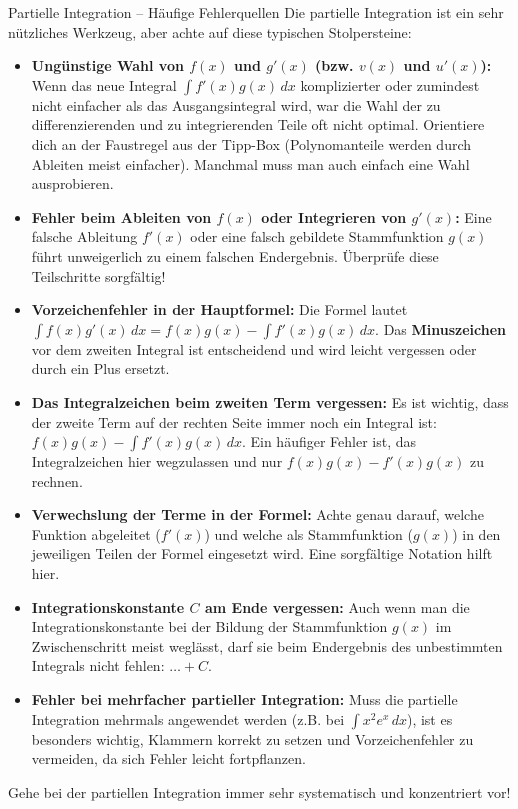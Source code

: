 \begin{fehlerboxumgebung}{Partielle Integration – Häufige Fehlerquellen}
Die partielle Integration ist ein sehr nützliches Werkzeug, aber achte auf diese typischen Stolpersteine:
\begin{itemize}
    \item \textbf{Ungünstige Wahl von $f(x)$ und $g'(x)$ (bzw. $v(x)$ und $u'(x)$):}
    Wenn das neue Integral $\int f'(x)g(x) \,dx$ komplizierter oder zumindest nicht einfacher als das Ausgangsintegral wird, war die Wahl der zu differenzierenden und zu integrierenden Teile oft nicht optimal. Orientiere dich an der Faustregel aus der Tipp-Box (Polynomanteile werden durch Ableiten meist einfacher). Manchmal muss man auch einfach eine Wahl ausprobieren.

    \item \textbf{Fehler beim Ableiten von $f(x)$ oder Integrieren von $g'(x)$:}
    Eine falsche Ableitung $f'(x)$ oder eine falsch gebildete Stammfunktion $g(x)$ führt unweigerlich zu einem falschen Endergebnis. Überprüfe diese Teilschritte sorgfältig!

    \item \textbf{Vorzeichenfehler in der Hauptformel:}
    Die Formel lautet $\int f(x) g'(x) \,dx = f(x)g(x) - \int f'(x)g(x) \,dx$. Das \textbf{Minuszeichen} vor dem zweiten Integral ist entscheidend und wird leicht vergessen oder durch ein Plus ersetzt.

    \item \textbf{Das Integralzeichen beim zweiten Term vergessen:}
    Es ist wichtig, dass der zweite Term auf der rechten Seite immer noch ein Integral ist: $f(x)g(x) - \mathbf{\int} f'(x)g(x) \,dx$. Ein häufiger Fehler ist, das Integralzeichen hier wegzulassen und nur $f(x)g(x) - f'(x)g(x)$ zu rechnen.

    \item \textbf{Verwechslung der Terme in der Formel:}
    Achte genau darauf, welche Funktion abgeleitet ($f'(x)$) und welche als Stammfunktion ($g(x)$) in den jeweiligen Teilen der Formel eingesetzt wird. Eine sorgfältige Notation hilft hier.

    \item \textbf{Integrationskonstante $C$ am Ende vergessen:}
    Auch wenn man die Integrationskonstante bei der Bildung der Stammfunktion $g(x)$ im Zwischenschritt meist weglässt, darf sie beim Endergebnis des unbestimmten Integrals nicht fehlen: $\dots + C$.

    \item \textbf{Fehler bei mehrfacher partieller Integration:}
    Muss die partielle Integration mehrmals angewendet werden (z.B. bei $\int x^2 e^x \,dx$), ist es besonders wichtig, Klammern korrekt zu setzen und Vorzeichenfehler zu vermeiden, da sich Fehler leicht fortpflanzen.
\end{itemize}
Gehe bei der partiellen Integration immer sehr systematisch und konzentriert vor!
\end{fehlerboxumgebung}


